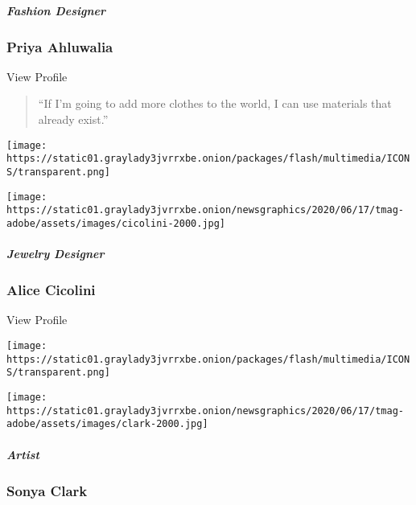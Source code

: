 \href{https://www.nytimes3xbfgragh.onion/2020/08/10/t-magazine/priya-ahluwalia-fashion-menswear.html}{}

\hypertarget{fashion-designer}{%
\subparagraph{Fashion Designer}\label{fashion-designer}}

\hypertarget{priya-ahluwalia}{%
\subsubsection{Priya Ahluwalia}\label{priya-ahluwalia}}

View Profile

\begin{quote}
``If I'm going to add more clothes to the world, I can use materials
that already exist.''
\end{quote}

\href{https://www.nytimes3xbfgragh.onion/2020/08/10/t-magazine/alice-cicolini-jewelry-art.html}{}

\texttt{[image: https://static01.graylady3jvrrxbe.onion/packages/flash/multimedia/ICONS/transparent.png]}

\texttt{[image: https://static01.graylady3jvrrxbe.onion/newsgraphics/2020/06/17/tmag-adobe/assets/images/cicolini-2000.jpg]}

\href{https://www.nytimes3xbfgragh.onion/2020/08/10/t-magazine/alice-cicolini-jewelry-art.html}{}

\hypertarget{jewelry-designer}{%
\subparagraph{Jewelry Designer}\label{jewelry-designer}}

\hypertarget{alice-cicolini}{%
\subsubsection{Alice Cicolini}\label{alice-cicolini}}

View Profile

\href{https://nytimes3xbfgragh.onion/2020/08/10/t-magazine/sonya-clark-flags-art.html}{}

\texttt{[image: https://static01.graylady3jvrrxbe.onion/packages/flash/multimedia/ICONS/transparent.png]}

\texttt{[image: https://static01.graylady3jvrrxbe.onion/newsgraphics/2020/06/17/tmag-adobe/assets/images/clark-2000.jpg]}

\href{https://nytimes3xbfgragh.onion/2020/08/10/t-magazine/sonya-clark-flags-art.html}{}

\hypertarget{artist}{%
\subparagraph{Artist}\label{artist}}

\hypertarget{sonya-clark}{%
\subsubsection{Sonya Clark}\label{sonya-clark}}

